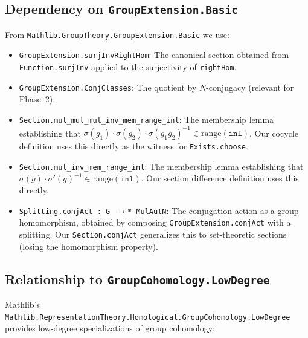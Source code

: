 \documentclass[11pt]{article}
\begin{document}
\subsection{Dependency on \texttt{GroupExtension.Basic}}

From \texttt{Mathlib.GroupTheory.GroupExtension.Basic} we use:

\begin{itemize}[nosep]
\item \texttt{GroupExtension.surjInvRightHom}: The canonical section obtained from
  \texttt{Function.surjInv} applied to the surjectivity of \texttt{rightHom}.

\item \texttt{GroupExtension.ConjClasses}: The quotient by $N$-conjugacy (relevant for
  Phase~2).

\item \texttt{Section.mul\_mul\_mul\_inv\_mem\_range\_inl}: The membership lemma
  establishing that $\sigma(g_1) \cdot \sigma(g_2) \cdot \sigma(g_1 g_2)^{-1} \in
  \mathrm{range}(\texttt{inl})$. Our cocycle definition uses this directly as the
  witness for \texttt{Exists.choose}.

\item \texttt{Section.mul\_inv\_mem\_range\_inl}: The membership lemma establishing that
  $\sigma(g) \cdot \sigma'(g)^{-1} \in \mathrm{range}(\texttt{inl})$. Our section
  difference definition uses this directly.

\item \texttt{Splitting.conjAct : G $\to$* MulAut\;N}: The conjugation action as a
  group homomorphism, obtained by composing \texttt{GroupExtension.conjAct} with a
  splitting. Our \texttt{Section.conjAct} generalizes this to set-theoretic sections
  (losing the homomorphism property).
\end{itemize}

\subsection{Relationship to \texttt{GroupCohomology.LowDegree}}

Mathlib's \texttt{Mathlib.RepresentationTheory.Homological.GroupCohomology.LowDegree}
provides low-degree specializations of group cohomology:
\end{document}
